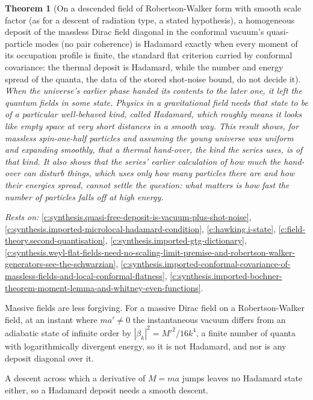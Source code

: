 \documentclass[11pt]{article}
\newtheorem{theorem}{Theorem}[section]
\theoremstyle{definition}
\theoremstyle{plain}
\begin{document}
\begin{theorem}[On a descended field of Robertson-Walker form with smooth scale factor (as for a descent of radiation type, a stated hypothesis), a homogeneous deposit of the massless Dirac field diagonal in the conformal vacuum's quasi-particle modes (no pair coherence) is Hadamard exactly when every moment of its occupation profile is finite, the standard flat criterion carried by conformal covariance: the thermal deposit is Hadamard, while the number and energy spread of the quanta, the data of the stored shot-noise bound, do not decide it]\label{c:synthesis.deposit-over-the-conformal-vacuum-is-hadamard-exactly-when-every-occupation-moment-is-finite}
When the universe's earlier phase handed its contents to the later one, it left the quantum fields in some state. Physics in a gravitational field needs that state to be of a particular well-behaved kind, called Hadamard, which roughly means it looks like empty space at very short distances in a smooth way. This result shows, for massless spin-one-half particles and assuming the young universe was uniform and expanding smoothly, that a thermal hand-over, the kind the series uses, is of that kind. It also shows that the series' earlier calculation of how much the hand-over can disturb things, which uses only how many particles there are and how their energies spread, cannot settle the question: what matters is how fast the number of particles falls off at high energy.
\end{theorem}
\noindent\emph{Rests on:} \ref{c:synthesis.quasi-free-deposit-is-vacuum-plus-shot-noise}, \ref{c:synthesis.imported-microlocal-hadamard-condition}, \ref{c:hawking.i-state}, \ref{c:field-theory.second-quantisation}, \ref{c:synthesis.imported-gtg-dictionary}, \ref{c:synthesis.weyl-flat-fields-need-no-scaling-limit-premise-and-robertson-walker-generators-see-the-schwarzian}, \ref{c:synthesis.imported-conformal-covariance-of-massless-fields-and-local-conformal-flatness}, \ref{c:synthesis.imported-bochner-theorem-moment-lemma-and-whitney-even-functions}.

Massive fields are less forgiving. For a massive Dirac field on a Robertson-Walker field, at an instant where $ma' \neq 0$ the instantaneous vacuum differs from an adiabatic state of infinite order by $|\beta_{k}|^{2} = M'^{2}/16k^{4}$, a finite number of quanta with logarithmically divergent energy, so it is not Hadamard, and nor is any deposit diagonal over it.

A descent across which a derivative of $M = ma$ jumps leaves no Hadamard state either, so a Hadamard deposit needs a smooth descent.
\end{document}
